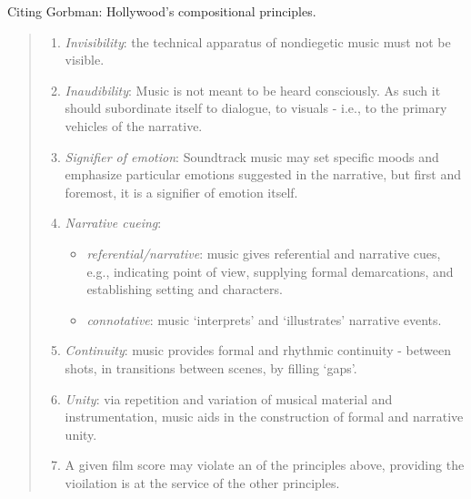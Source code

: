 Citing Gorbman: Hollywood's compositional principles.
\begin{quotation}

\begin{enumerate}
\item \textit{Invisibility}: the technical apparatus of nondiegetic music must not be visible.
\item \textit{Inaudibility}: Music is not meant to be heard consciously. As such it should subordinate itself to dialogue, to visuals - i.e., to the primary vehicles of the narrative.
\item \textit{Signifier of emotion}: Soundtrack music may set specific moods and emphasize particular emotions suggested in the narrative, but first and foremost, it is a signifier of emotion itself.
\item \textit{Narrative cueing}: 
\begin{itemize}
\item \textit{referential/narrative}: music gives referential and narrative cues, e.g., indicating point of view, supplying formal demarcations, and establishing setting and characters.
\item \textit{connotative}: music `interprets' and `illustrates' narrative events.
\end{itemize}
\item \textit{Continuity}: music provides formal and rhythmic continuity - between shots, in transitions between scenes, by filling `gaps'.
\item \textit{Unity}: via repetition and variation of musical material and instrumentation, music aids in the construction of formal and narrative unity.
\item A given film score may violate an of the principles above, providing the vioilation is at the service of the other principles.

\end{enumerate}
\end{quotation}



